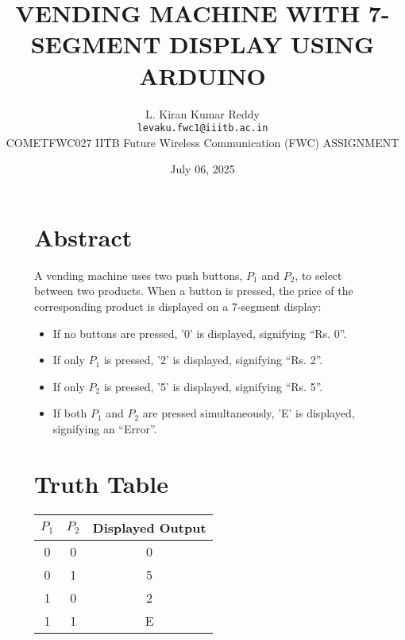 \documentclass[12pt,a4paper]{article}
\title{\textbf{VENDING MACHINE WITH 7-SEGMENT DISPLAY USING ARDUINO}}
\author{L. Kiran Kumar Reddy \\ \texttt{levaku.fwc1@iiitb.ac.in} \\  \hspace{-0.5cm }COMETFWC027 \hspace{0.4cm}IITB Future Wireless Communication (FWC) \hspace{0.2cm}     ASSIGNMENT}
\date{July 06, 2025}
\begin{document}
\maketitle

\begin{figure}[H]
  \centering
  \begin{minipage}[t]{0.48\textwidth}
    \section*{Abstract}
    \small
    A vending machine uses two push buttons, $P_1$ and $P_2$, to select between two products. When a button is pressed, the price of the corresponding product is displayed on a 7-segment display:

    \begin{itemize}
        \item If no buttons are pressed, '0' is displayed, signifying ``Rs. 0''.
        \item If only $P_1$ is pressed, '2' is displayed, signifying ``Rs. 2''.
        \item If only $P_2$ is pressed, '5' is displayed, signifying ``Rs. 5''.
        \item If both $P_1$ and $P_2$ are pressed simultaneously, 'E' is displayed, signifying an ``Error''.
    \end{itemize}

    \vspace{0.5cm}

    \section*{Truth Table}

    \renewcommand{\arraystretch}{1.3}
    \begin{tabular}{|c|c|c|}
      \hline
      $P_1$ & $P_2$ & Displayed Output \\ \hline
      0 & 0 & 0 \\ \hline
      0 & 1 & 5 \\ \hline
      1 & 0 & 2 \\ \hline
      1 & 1 & E \\ \hline
    \end{tabular}
  \end{minipage}\hfill
  \begin{minipage}[t]{0.48\textwidth}

\end{minipage}
\end{figure}
\end{document}
